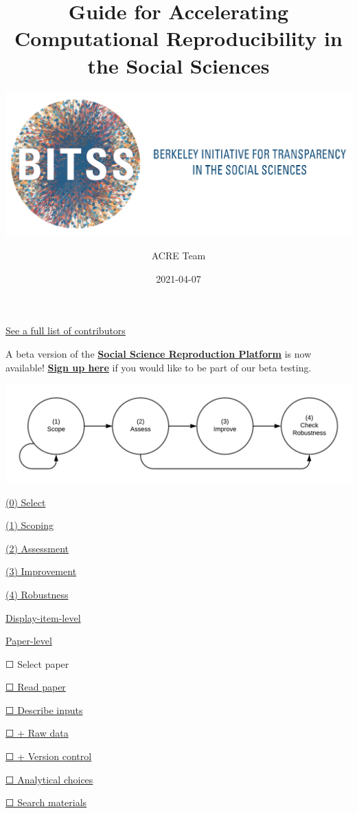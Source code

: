 \documentclass[
]{book}
\title{Guide for Accelerating Computational Reproducibility in the Social Sciences}
\subtitle{\href{https://www.bitss.org/}{\includegraphics{BITSS_logo_horizontal.png}}}
\author{ACRE Team}
\date{2021-04-07}
\begin{document}
\maketitle

{
\setcounter{tocdepth}{1}
\tableofcontents
}
\hypertarget{section}{%
\chapter*{}\label{section}}

\protect\hyperlink{contributions}{See a full list of contributors}

A beta version of the \href{https://www.socialsciencereproduction.org/}{\textbf{Social Science Reproduction Platform}} is now available! \href{https://forms.gle/yZivWcwijCzEhrBU6}{\textbf{Sign up here}} if you would like to be part of our beta testing.

\includegraphics[width=1\linewidth]{stages}

\protect\hyperlink{select}{(0) Select}

\protect\hyperlink{scoping}{(1) Scoping}

\protect\hyperlink{assessment}{(2) Assessment}

\protect\hyperlink{improvements}{(3) Improvement}

\protect\hyperlink{robust}{(4) Robustness}

\protect\hyperlink{di-imp}{Display-item-level}

\protect\hyperlink{paper-level}{Paper-level}

☐ Select paper

\protect\hyperlink{read-summ}{☐ Read paper}

\protect\hyperlink{describe-inputs}{☐ Describe inputs}

\protect\hyperlink{rd}{☐ + Raw data}

\protect\hyperlink{paper-level}{☐ + Version control}

\protect\hyperlink{id-analy}{☐ Analytical choices}

\protect\hyperlink{declaree}{☐ Search materials}
\end{document}
